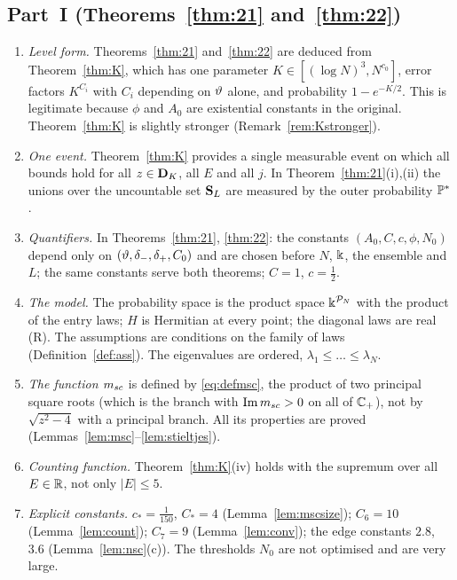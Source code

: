 \subsection{Part~I (Theorems~\ref{thm:21} and~\ref{thm:22})}\label{app:diffNP}
\begin{enumerate}[leftmargin=2em,itemsep=2pt]
\item \emph{Level form.} Theorems~\ref{thm:21} and~\ref{thm:22} are deduced from Theorem~\ref{thm:K}, which has one parameter $K\in[(\log N)^3,N^{c_0}]$, error factors $K^{C_i}$ with $C_i$ depending on $\vartheta$ alone, and probability $1-e^{-K/2}$.
This is legitimate because $\phi$ and $A_0$ are existential constants in the original. Theorem~\ref{thm:K} is slightly stronger (Remark~\ref{rem:Kstronger}).
\item \emph{One event.} Theorem~\ref{thm:K} provides a single measurable event on which all bounds hold for all $z\in\mathbf{D}_K$, all $E$ and all $j$. In Theorem~\ref{thm:21}(i),(ii) the unions over the uncountable set $\mathbf{S}_L$ are measured by the outer probability $\mathbb{P}^*$.
\item \emph{Quantifiers.} In Theorems~\ref{thm:21}, \ref{thm:22}: the constants $(A_0,C,c,\phi,N_0)$ depend only on $(\vartheta,\delta_-,\delta_+,C_0)$ and are chosen before $N$, $\Bbbk$, the ensemble and $L$; the same constants serve both theorems; $C=1$, $c=\frac12$.
\item \emph{The model.} The probability space is the product space $\Bbbk^{\mathcal P_N}$ with the product of the entry laws; $H$ is Hermitian at every point; the diagonal laws are real (R). The assumptions are conditions on the family of laws (Definition~\ref{def:ass}).
The eigenvalues are ordered, $\lambda_1\le\dots\le\lambda_N$.
\item \emph{The function $m_{sc}$} is defined by \eqref{eq:defmsc}, the product of two principal square roots (which is the branch with $\operatorname{Im}m_{sc}>0$ on all of $\mathbb{C}_+$), not by $\sqrt{z^2-4}$ with a principal branch. All its properties are proved (Lemmas~\ref{lem:msc}--\ref{lem:stieltjes}).
\item \emph{Counting function.} Theorem~\ref{thm:K}(iv) holds with the supremum over all $E\in\mathbb{R}$, not only $|E|\le5$.
\item \emph{Explicit constants.} $c_*=\frac1{150}$, $C_*=4$ (Lemma~\ref{lem:mscsize}); $C_6=10$ (Lemma~\ref{lem:count}); $C_7=9$ (Lemma~\ref{lem:conv}); the edge constants $2.8$, $3.6$ (Lemma~\ref{lem:nsc}(c)). The thresholds $N_0$ are not optimised and are very large.
\end{enumerate}

